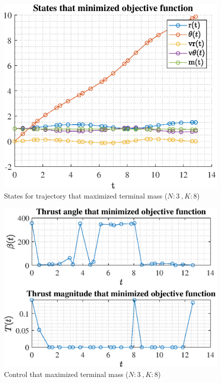 \documentclass[]{article}
\begin{document}
\begin{figure}
	\centering
	\includegraphics[scale=0.75]{states_N3_K8_C3_mf.eps}
	\caption{States for trajectory that maximized terminal mass (\(N:3\ , K:8\))}
	\label{fig:states_N3_K8_C3_mf}
\end{figure}
\begin{figure}
	\centering
	\includegraphics[scale=0.75]{control_N3_K8_C3_mf.eps}
	\caption{Control that maximized terminal mass (\(N:3\ , K:8\))}
	\label{fig:control_N3_K8_C3_mf}
\end{figure}
\end{document}
